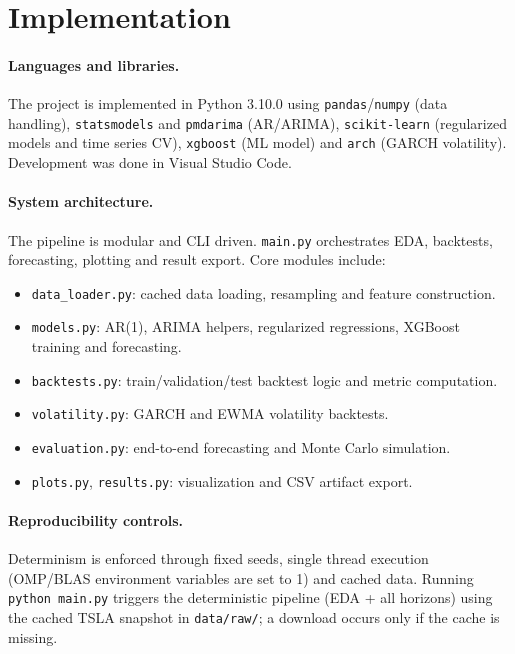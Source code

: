 \documentclass[11pt,a4paper]{article}
\begin{document}
\section{Implementation}
\label{sec:implementation}

\paragraph{Languages and libraries.}
The project is implemented in Python 3.10.0 using \texttt{pandas}/\texttt{numpy} (data handling), \texttt{statsmodels} and \texttt{pmdarima} (AR/ARIMA), \texttt{scikit-learn} (regularized models and time series CV), \texttt{xgboost} (ML model) and \texttt{arch} (GARCH volatility). Development was done in Visual Studio Code.

\paragraph{System architecture.}
The pipeline is modular and CLI driven. \texttt{main.py} orchestrates EDA, backtests, forecasting, plotting and result export. Core modules include:
\begin{itemize}
    \item \texttt{data\_loader.py}: cached data loading, resampling and feature construction.
    \item \texttt{models.py}: AR(1), ARIMA helpers, regularized regressions, XGBoost training and forecasting.
    \item \texttt{backtests.py}: train/validation/test backtest logic and metric computation.
    \item \texttt{volatility.py}: GARCH and EWMA volatility backtests.
    \item \texttt{evaluation.py}: end-to-end forecasting and Monte Carlo simulation.
    \item \texttt{plots.py}, \texttt{results.py}: visualization and CSV artifact export.
\end{itemize}

\paragraph{Reproducibility controls.}
Determinism is enforced through fixed seeds, single thread execution (OMP/BLAS environment variables are set to 1) and cached data. Running \texttt{python main.py} triggers the deterministic pipeline (EDA + all horizons) using the cached TSLA snapshot in \texttt{data/raw/}; a download occurs only if the cache is missing.
\end{document}
